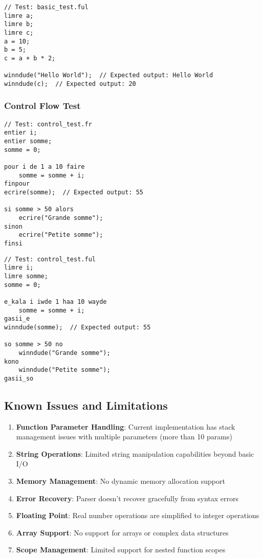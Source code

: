 \documentclass[12pt,a4paper]{article}
\begin{document}
\begin{lstlisting}[language=Fulfulde, caption={Fulfulde Basic Operations Test}]
// Test: basic_test.ful
limre a;
limre b;
limre c;
a = 10;
b = 5;
c = a + b * 2;

winndude("Hello World");  // Expected output: Hello World
winndude(c);  // Expected output: 20
\end{lstlisting}

\subsubsection{Control Flow Test}

\begin{lstlisting}[language=French, caption={French Control Flow Test}]
// Test: control_test.fr
entier i;
entier somme;
somme = 0;

pour i de 1 a 10 faire
    somme = somme + i;
finpour
ecrire(somme);  // Expected output: 55

si somme > 50 alors
    ecrire("Grande somme");
sinon
    ecrire("Petite somme");
finsi

\end{lstlisting}

\begin{lstlisting}[language=French, caption={Fulfulde Control Flow Test}]
// Test: control_test.ful
limre i;
limre somme;
somme = 0;

e_kala i iwde 1 haa 10 wayde
    somme = somme + i;
gasii_e
winndude(somme);  // Expected output: 55

so somme > 50 no
    winndude("Grande somme");
kono
    winndude("Petite somme");
gasii_so

\end{lstlisting}

\subsection{Known Issues and Limitations}

\begin{enumerate}
    \item \textbf{Function Parameter Handling}: Current implementation has stack management issues with multiple parameters (more than 10 params)
    \item \textbf{String Operations}: Limited string manipulation capabilities beyond basic I/O
    \item \textbf{Memory Management}: No dynamic memory allocation support
    \item \textbf{Error Recovery}: Parser doesn't recover gracefully from syntax errors
    \item \textbf{Floating Point}: Real number operations are simplified to integer operations
    \item \textbf{Array Support}: No support for arrays or complex data structures
    \item \textbf{Scope Management}: Limited support for nested function scopes
\end{enumerate}
\end{document}
